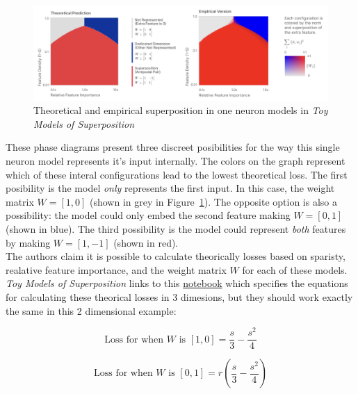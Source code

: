 \documentclass{article} %
\begin{document}
\begin{figure}[h]
    \centering
    \includegraphics[width=0.99\linewidth]{phase_changes/images/phase_changes_anthropic.png}
    \captionsetup{font=footnotesize, width=0.7\linewidth} %
    \caption{
        Theoretical and empirical superposition in one neuron models in 
        \textit{Toy Models of Superposition}\cite{elhage2022toy}
    }
    \label{fig:section4_anthropic}
\end{figure}

These phase diagrams present three discreet posibilities for the way this single
neuron model represents it's input internally. The colors on the graph represent
which of these interal configurations lead to the lowest theoretical loss.
The first posibility is the model 
\textit{only} represents the first input. In this case, the weight matrix $W = [1, 0]$ (shown in
grey in Figure~\ref{fig:section4_anthropic}). The opposite option is also a 
possibility: the model could only embed the second feature making $W = [0, 1]$ 
(shown in blue). The third possibility is the model could represent \textit{both}
features by making $W = [1, -1]$ (shown in red). \\

The authors claim it is possible to calculate theorically losses based on sparisty,
realative feature importance, and the weight matrix $W$ for each of these models. 
\textit{Toy Models of Superposition} links to this 
\href{https://github.com/wattenberg/superposition/blob/main/Exploring_Exact_Toy_Models.ipynb}{notebook} 
which specifies the equations for calculating these theorical losses in 3 
dimesions, but they should work exactly the same in this 2 dimensional example:

\begin{equation}
    \label{eq:loss1}
    \text{Loss for when  $W$ is $[1, 0]$} = \frac{s}{3} - \frac{s^2}{4}
\end{equation}

\begin{equation}
    \label{eq:loss2}
    \text{Loss for when  $W$ is $[0, 1]$} = r \left(\frac{s}{3} - \frac{s^2}{4}\right)
\end{equation}
\end{document}

